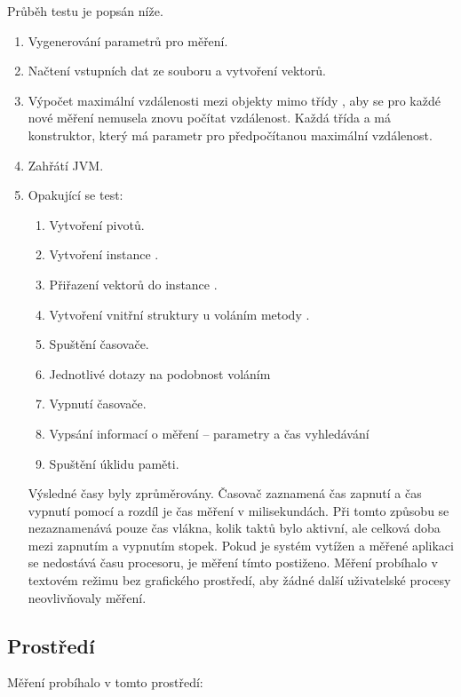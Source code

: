 Průběh testu je popsán níže.

\begin{enumerate}
\item Vygenerování parametrů pro měření.
\item Načtení vstupních dat ze souboru a vytvoření vektorů.
\item Výpočet maximální vzdálenosti mezi objekty mimo třídy , aby se pro každé nové měření nemusela znovu počítat vzdálenost.
Každá třída  a  má konstruktor, který má parametr pro předpočítanou maximální vzdálenost.
\item Zahřátí JVM.
\item Opakující se test:
\begin{enumerate}
\item Vytvoření pivotů.
\item Vytvoření instance \type{\MIndex}.
\item Přiřazení vektorů do instance \type{\MIndex}.
\item Vytvoření vnitřní struktury \MIndex u voláním metody .
\item Spuštění časovače.
\item Jednotlivé dotazy na podobnost voláním 
\item Vypnutí časovače.
\item Vypsání informací o měření -- parametry a čas vyhledávání
\item Spuštění úklidu paměti.
\end{enumerate}

Výsledné časy byly zprůměrovány.
Časovač zaznamená čas zapnutí a čas vypnutí pomocí  a rozdíl je čas měření v milisekundách.
Při tomto způsobu se nezaznamenává pouze čas vlákna, kolik taktů bylo aktivní, ale celková doba mezi zapnutím a vypnutím stopek.
Pokud je systém vytížen a měřené aplikaci se nedostává času procesoru, je měření tímto postiženo.
Měření probíhalo v textovém režimu bez grafického prostředí, aby žádné další uživatelské procesy neovlivňovaly měření.

\end{enumerate}
\subsection{Prostředí}
Měření probíhalo v tomto prostředí:

